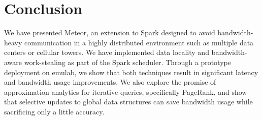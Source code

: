 \section{Conclusion}

We have presented Meteor, an extension to Spark designed to avoid bandwidth-heavy communication in a highly distributed environment such as multiple data centers or cellular towers. We have implemented data locality and bandwidth-aware work-stealing as part of the Spark scheduler. Through a prototype  deployment on emulab,  we show that both techniques result in significant latency and bandwidth usage improvements. We also explore the promise of approximation analytics for iterative queries, specifically PageRank, and show that selective updates to global data structures can save bandwidth usage while sacrificing only a little accuracy. 
